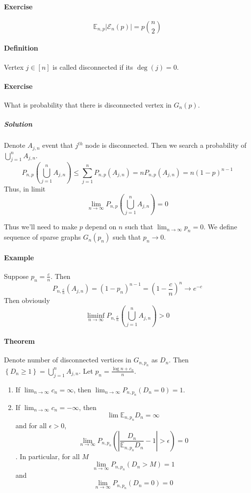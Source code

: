\paragraph{Exercise}
$$\mathbb{E}_{n,p} \left| \mathcal{E}_{n}(p) \right| = p \binom{n}{2}$$
\paragraph{Definition}
Vertex $j\in [n]$ is called disconnected if its $\deg (j)= 0$.
\paragraph{Exercise}
What is probability that there is disconnected vertex in $G_{n}(p)$.
\subparagraph{Solution}
Denote $A_{j,n}$ event that $j^{th}$ node is disconnected. Then we search a probability of $\bigcup_{j=1}^n A_{j,n}$.
$$P_{n,p} \left(\bigcup_{j=1}^n A_{j,n} \right) \leq \sum_{j=1}^n P_{n,p} (A_{j,n}) = nP_{n,p}  \left( A_{j,n} \right) = n(1-p)^{n-1}$$
Thus, in limit
$$\lim_{n \to \infty } P_{n,p} \left(\bigcup_{j=1}^n A_{j,n} \right)   = 0$$


Thus we'll need to make $p$ depend on $n$ such that $\lim_{n \to \infty } p_n = 0$. We define sequence of sparse graphs
$G_n(p_n)$ such that $p_n \to 0$.
\paragraph{Example}
Suppose $p_n = \frac{c}{n}$. Then
$$P_{n,\frac{c}{n}} (A_{j,n} )= \left( 1-p_n \right)^{n-1} = \left( 1- \frac{c}{n} \right)^n \to e^{-c}$$
Then obviously
$$\liminf_{n \to \infty} P_{n,\frac{c}{n}}\left(\bigcup_{j=1}^n A_{j,n} \right) > 0 $$
\paragraph{Theorem} Denote number of disconnected vertices in $G_{n,p_n}$ as $D_n$. Then $\left\{ D_n \geq 1 \right\} = \bigcup_{j=1}^n A_{j,n} $. Let $p_n = \frac{\log n + c_n}{n}$. 
\begin{enumerate}
	\item If $\lim_{n \to \infty} c_n = \infty$, then $\lim_{n \to \infty} P_{n,p_n} \left(D_n = 0\right) = 1$.
	\item If $\lim_{n \to \infty} c_n = -\infty$, then 
	$$\lim \mathbb{E}_{n,p_n} D_n = \infty$$
	and for all $\epsilon > 0$, $$\lim_{n \to \infty} P_{n,p_n} \left(\left|\frac{D_n}{\mathbb{E}_{n,p_n}  D_n} - 1\right| > \epsilon\right) = 0$$. In particular, for all $M$ $$\lim_{n \to \infty} P_{n, p_n} \left( D_n > M \right) = 1$$ and $$\lim_{n \to \infty} P_{n,p_n} \left(D_n = 0\right) = 0$$

\end{enumerate}

